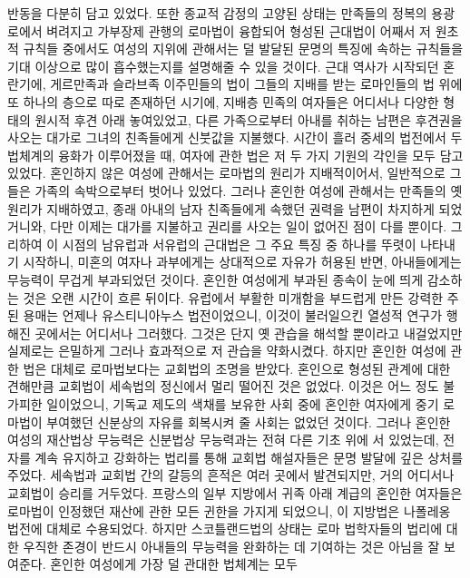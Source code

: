 반동을 다분히 담고 있었다.
또한 종교적 감정의 고양된 상태는
만족들의 정복의 용광로에서 벼려지고
가부장제 관행의 로마법이 융합되어 형성된
근대법이
어째서
저 원초적 규칙들 중에서도
여성의 지위에 관해서는
덜 발달된 문명의 특징에 속하는 규칙들을 기대 이상으로 많이 흡수했는지를
설명해줄 수 있을 것이다.
근대 역사가 시작되던 혼란기에,
게르만족과 슬라브족 이주민들의 법이
그들의 지배를 받는 로마인들의 법 위에 또 하나의 층으로 따로 존재하던 시기에,
지배층 민족의 여자들은 어디서나
다양한 형태의 원시적 후견 아래 놓여있었고,
다른 가족으로부터 아내를 취하는 남편은
후견권을 사오는 대가로
그녀의 친족들에게
신붓값을 지불했다.
시간이 흘러 중세의 법전에서 두 법체계의 융화가 이루어졌을 때,
여자에 관한 법은 저 두 가지 기원의 각인을 모두 담고 있었다.
혼인하지 않은 여성에 관해서는
로마법의 원리가
지배적이어서,
일반적으로 
그들은 가족의 속박으로부터 벗어나 있었다.
그러나
혼인한 여성에 관해서는
만족들의 옛 원리가 지배하였고,
종래 아내의 남자 친족들에게 속했던 권력을 남편이 차지하게 되었거니와,
다만 이제는 대가를 지불하고 권리를 사오는 일이 없어진 점이 다를 뿐이다.
그리하여 이 시점의 남유럽과 서유럽의 근대법은 그 주요 특징 중 하나를
뚜렷이 나타내기 시작하니,
미혼의 여자나 과부에게는 상대적으로 자유가 허용된 반면,
아내들에게는 무능력이 무겁게 부과되었던 것이다.
혼인한 여성에게 부과된 종속이 눈에 띄게 감소하는 것은 오랜 시간이 흐른 뒤이다.
유럽에서 부활한 미개함을 부드럽게 만든 강력한 주된 용매는
언제나 유스티니아누스 법전이었으니,
이것이 불러일으킨 열성적 연구가 행해진 곳에서는 어디서나 그러했다.
그것은
단지 옛 관습을 해석할 뿐이라고 내걸었지만 실제로는
은밀하게 그러나 효과적으로 저 관습을 약화시켰다.
하지만 혼인한 여성에 관한 법은 대체로 로마법보다는 교회법의 조명을 받았다.
혼인으로 형성된 관계에 대한 견해만큼
교회법이
세속법의 정신에서
멀리 떨어진 것은 없었다.
이것은 어느 정도 불가피한 일이었으니,
기독교 제도의 색채를 보유한 사회 중에
혼인한 여자에게 중기 로마법이 부여했던 신분상의 자유를 회복시켜 줄 사회는
없었던 것이다.
그러나 혼인한 여성의 재산법상 무능력은 신분법상 무능력과는 전혀 다른
기초 위에 서 있었는데,
전자를 계속 유지하고 강화하는 법리를 통해
교회법 해설자들은 문명 발달에 깊은 상처를 주었다.
세속법과 교회법 간의 갈등의 흔적은 여러 곳에서 발견되지만,
거의 어디서나 교회법이 승리를 거두었다.
프랑스의 일부 지방에서
귀족 아래 계급의 혼인한 여자들은
로마법이 인정했던 재산에 관한 모든 귄한을 가지게 되었으니,
이 지방법은 나폴레옹 법전에 대체로 수용되었다.
하지만 스코틀랜드법의 상태는
로마 법학자들의 법리에 대한 우직한 존경이
반드시 아내들의 무능력을 완화하는 데 기여하는 것은 아님을 잘
보여준다.
혼인한 여성에게 가장 덜 관대한 법체계는 모두
